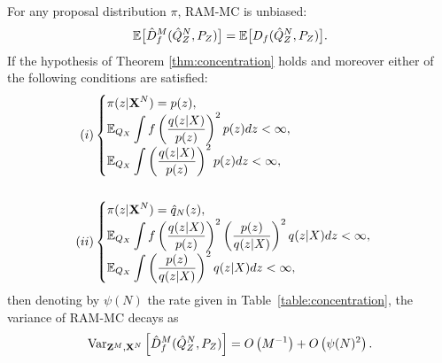 \begin{theorem}\label{thm:mc-variance}
For any proposal distribution $\pi$, RAM-MC is unbiased:
%
\begin{align*}
\mathbb{E}\bigl[\hat{D}^M_f( \hat{Q}_Z^N , P_Z)\bigr] =\mathbb{E}\bigl[D_f( \hat{Q}^N_{Z} , P_Z )\bigr].
\end{align*}
%
If the hypothesis of Theorem \ref{thm:concentration} holds and moreover either of the following conditions are satisfied:
\begin{align*}
(i)& \begin{cases}
\displaystyle \pi(z|\mathbf{X}^N) = p(z), \\
\displaystyle \mathbb{E}_{Q_X} \int f\left( \frac{q(z|X)}{p(z)}\right)^2 p(z) dz  < \infty, \\
\displaystyle \mathbb{E}_{Q_X} \int \left( \frac{q(z|X)}{p(z)} \right)^2 p(z) dz < \infty,
\end{cases}\\ \ \\
(ii)& \begin{cases}
\displaystyle \pi(z | \mathbf{X}^N) = \hat{q}_N(z), \\
\displaystyle \mathbb{E}_{Q_X} \int f\left( \frac{q(z|X)}{p(z)}\right)^2 \left(\frac{p(z)}{q(z|X)}\right)^2 q(z|X) dz < \infty, \\
\displaystyle \mathbb{E}_{Q_X} \int \left(\frac{p(z)}{q(z|X)} \right)^2 q(z|X) dz < \infty,
\end{cases}
\end{align*}
then denoting by $\psi(N)$ the rate given in Table~\ref{table:concentration}, the variance of RAM-MC decays as
\begin{align*}
    \text{Var}_{\mathbf{Z}^M, \mathbf{X}^N} \left[\hat{D}^M_f( \hat{Q}_Z^N , P_Z)  \right] = 
    O\left(M^{-1}\right) + O\left( \psi(N)^2 \right).
\end{align*}
%
\end{theorem}

